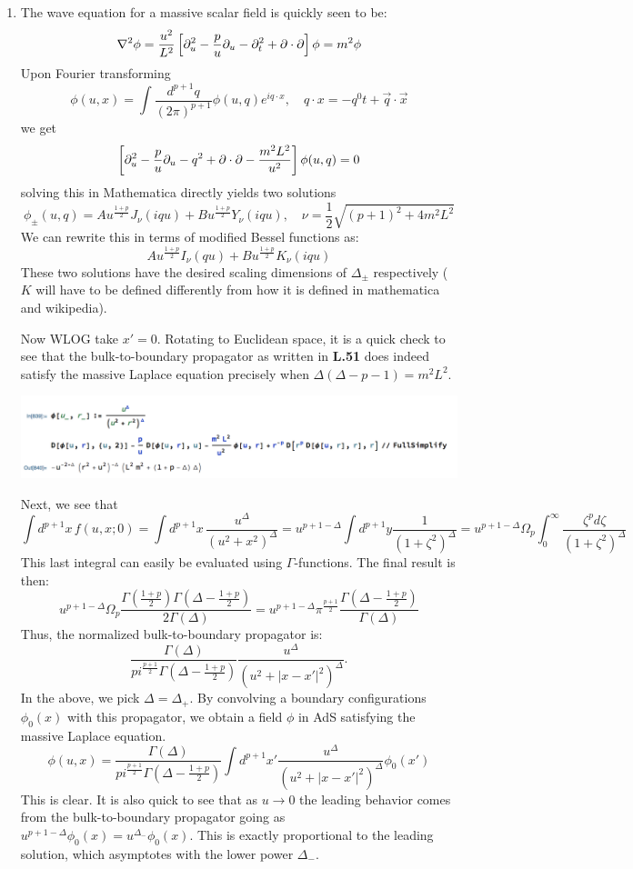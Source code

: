 \documentclass[11pt, class=article, crop=false]{standalone}
\begin{document}
\begin{enumerate}
	
	\item The wave equation for a massive scalar field is quickly seen to be:
	\[
		\nabla^2 \phi = \frac{u^2}{L^2} \left[\partial_u^2 - \frac{p}{u} \partial_u - \partial_t^2 + \partial \cdot \partial \right] \phi = m^2 \phi 
	\]
	Upon Fourier transforming
	\[
		\phi(u, x) = \int \frac{d^{p+1} q}{(2 \pi)^{p+1}} \phi(u, q) e^{i q \cdot x}, \quad q \cdot x = - q^0 t + \vec q \cdot \vec x
	\]
	we get
	\[
		 \left[\partial_u^2 - \frac{p}{u} \partial_u - q^2 + \partial \cdot \partial - \frac{m^2 L^2}{u^2} \right] \phi(u, q) = 0
	\]
	solving this in Mathematica directly yields two solutions
	\[
		\phi_\pm(u, q) = A u^{\frac{1+p}{2}} J_\nu ( i q u ) + B u^{\frac{1+p}{2}} Y_\nu ( i q u ), \quad \nu = \frac12 \sqrt{(p+1)^2 + 4 m^2 L^2}
	\]
	We can rewrite this in terms of modified Bessel functions as:
	\[
		A u^{\frac{1+p}{2}} I_\nu (  q u ) + B u^{\frac{1+p}{2}} K_\nu ( i q u )
	\]
	These two solutions have the desired scaling dimensions of $\Delta_\pm$ respectively ($K$ will have to be defined differently from how it is defined in mathematica and wikipedia).
	
	Now WLOG take $x' = 0$. Rotating to Euclidean space, it is a quick check to see that the bulk-to-boundary propagator as written in \textbf{L.51} does indeed satisfy the massive Laplace equation precisely when $\Delta (\Delta - p - 1) = m^2 L^2$.
	\begin{center}
		\includegraphics[scale=0.5]{"Figures/Bulk-to-Boundary"}
	\end{center}
	
	Next, we see that
	\[
		\int d^{p+1} x \, f(u, x; 0) = \int d^{p+1} x\, \frac{u^\Delta}{(u^2 + x^2)^\Delta} = u^{p+1-\Delta} \int d^{p+1} y \frac{1}{(1+\zeta^2)^\Delta} = u^{p+1-\Delta} \Omega_{p} \int_0^\infty \frac{\zeta^p d\zeta}{(1 + \zeta^2)^\Delta}
	\]
	This last integral can easily be evaluated using $\Gamma$-functions. The final result is then:
	\[
		u^{p+1-\Delta} \Omega_{p} \frac{\Gamma(\frac{1+p}{2}) \Gamma(\Delta - \frac{1+p}{2})}{2\Gamma(\Delta)} = u^{p+1-\Delta} \pi^{\frac{p+1}{2}} \frac{\Gamma(\Delta - \frac{1+p}{2})}{\Gamma(\Delta)}
	\]
	Thus, the normalized bulk-to-boundary propagator is:
	\[
		\frac{\Gamma(\Delta)}{pi^{\frac{p+1}{2}}  \Gamma(\Delta -  \frac{1+p}{2})} \frac{u^\Delta}{(u^2 + |x-x'|^2)^\Delta}.
	\]
	In the above, we pick $\Delta = \Delta_+$. By convolving a boundary configurations $\phi_0(x)$ with this propagator, we obtain a field $\phi$ in AdS satisfying the massive Laplace equation. 
	\[
		\phi(u, x) = \frac{\Gamma(\Delta)}{pi^{\frac{p+1}{2}}  \Gamma(\Delta -  \frac{1+p}{2})} \int d^{p+1} x' \frac{u^\Delta}{(u^2 + |x-x'|^2)^\Delta} \phi_0(x')
	\]
	This is clear. It is also quick to see that as $u \to 0$ the leading behavior comes from the bulk-to-boundary propagator going as $u^{p+1-\Delta}  \phi_0(x) = u^{\Delta_-} \phi_0(x)$. This is exactly proportional to the leading solution, which asymptotes with the lower power $\Delta_-$.
	

\end{enumerate}
\end{document}

